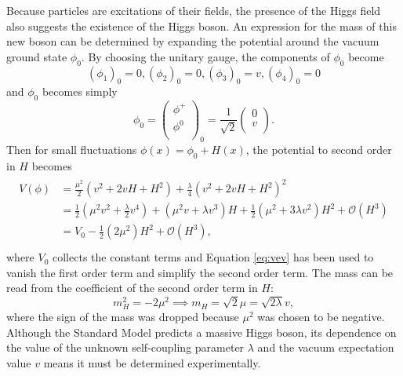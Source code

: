 Because particles are excitations of their fields, the presence of the Higgs field also suggests the existence of the Higgs boson. An expression for the mass of this new boson can be determined by expanding the potential around the vacuum ground state $\phi_{0}$. By choosing the unitary gauge, the components of $\phi_{0}$ become
\begin{equation}
  (\phi_{1})_{0} = 0, (\phi_{2})_{0} = 0, (\phi_{3})_{0} = v, (\phi_{4})_{0} = 0
\end{equation}
and $\phi_{0}$ becomes simply
\begin{equation}
  \phi_{0} = \begin{pmatrix}
               \phi^{+} \\
               \phi^{0} \\
             \end{pmatrix}_{0}
           = \frac{1}{\sqrt{2}}
             \begin{pmatrix}
               0 \\
               v \\
             \end{pmatrix}.
\end{equation}
Then for small fluctuations $\phi(x) = \phi_{0} + H(x)$, the potential to second order in $H$ becomes
\begin{align}
  \begin{split}
    V(\phi) &= \frac{\mu^{2}}{2}(v^{2} + 2vH + H^{2}) + \frac{\lambda}{4}(v^{2} + 2vH + H^{2})^{2} \\
            &= \frac{1}{2}(\mu^{2}v^{2} + \frac{\lambda}{2}v^{4}) + (\mu^{2}v + \lambda v^{3})H + \frac{1}{2}(\mu^{2} + 3\lambda v^{2})H^{2} + \mathcal{O}(H^{3}) \\
            &= V_{0} - \frac{1}{2}(2\mu^{2})H^{2} + \mathcal{O}(H^{3}), \\
  \end{split}
  \label{eq:higgsexpand}
\end{align}
where $V_{0}$ collects the constant terms and Equation \ref{eq:vev} has been used to vanish the first order term and simplify the second order term. The mass can be read from the coefficient of the second order term in $H$:
\begin{equation}
  m_{H}^{2} = -2\mu^{2} \implies m_{H} = \sqrt{2}\mu = \sqrt{2\lambda}v,
\end{equation}
where the sign of the mass was dropped because $\mu^2$ was chosen to be negative. Although the Standard Model predicts a massive Higgs boson, its dependence on the value of the unknown self-coupling parameter $\lambda$ and the vacuum expectation value $v$ means it must be determined experimentally.

